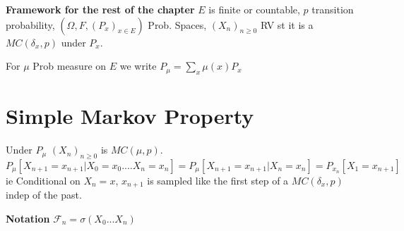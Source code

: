 \noindent
\textbf{Framework for the rest of the chapter} 
$E$ is finite or countable, $p$ transition probability, $(\Omega, F, (P_x)_{x \in E})$ Prob. Spaces, $(X_n)_{n \geq 0}$ RV st it is a  $MC(\delta_x, p)$ under $P_x$.

For $\mu$ Prob measure on $E $ we write $P_\mu= \sum_{x}\mu(x)P_x$

\section{Simple Markov Property}
Under $P_\mu$ $(X_n)_{n \geq 0}$ is $MC(\mu, p)$.
$P_\mu [X_{n+1}=x_{n+1} | X_0 = x_0....X_n=x_n] = P_\mu[X_{n+1}=x_{n+1}| X_n = x_n] = P_{x_n}[X_1 =x_{n+1}]$ ie Conditional on $X_n=x$, $x_{n+1}$ is sampled like the first step of a $MC(\delta_{x},p)$ indep of the past.

\textbf{Notation} $ \mathcal{F}_n = \sigma(X_0...X_n)$ 

